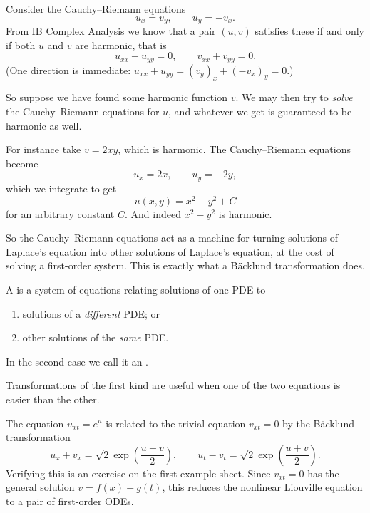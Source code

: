 \documentclass[a4paper]{scrartcl}
\begin{document}
\begin{example}
	Consider the Cauchy--Riemann equations
	$$
	u_x = v_y, \qquad u_y = -v_x.
	$$
	From IB Complex Analysis we know that a pair $(u,v)$ satisfies these if and only if both $u$ and $v$ are harmonic, that is
	$$
	u_{xx} + u_{yy} = 0, \qquad v_{xx}+v_{yy} = 0.
	$$
	(One direction is immediate: $u_{xx} + u_{yy} = (v_y)_x + (-v_x)_y = 0$.)

	So suppose we have found some harmonic function $v$. We may then try to \emph{solve} the Cauchy--Riemann equations for $u$, and whatever we get is guaranteed to be harmonic as well.

	For instance take $v = 2xy$, which is harmonic. The Cauchy--Riemann equations become
	$$
	u_x = 2x, \qquad u_y = -2y,
	$$
	which we integrate to get
	$$
	u(x,y) = x^2 - y^2 + C
	$$
	for an arbitrary constant $C$. And indeed $x^2 - y^2$ is harmonic.

	So the Cauchy--Riemann equations act as a machine for turning solutions of Laplace's equation into other solutions of Laplace's equation, at the cost of solving a first-order system. This is exactly what a B\"acklund transformation does.
\end{example}

\begin{definition}
	A  is a system of equations relating solutions of one PDE to
	\begin{enumerate}[label=(\roman*)]
		\item solutions of a \emph{different} PDE; or
		\item other solutions of the \emph{same} PDE.
	\end{enumerate}
	In the second case we call it an .
\end{definition}

Transformations of the first kind are useful when one of the two equations is easier than the other.

\begin{example}
	The equation $u_{xt} = e^u$ is related to the trivial equation $v_{xt} = 0$ by the B\"acklund transformation
	$$
	u_x + v_x = \sqrt2\exp\left(\frac{u-v}{2}\right), \qquad u_t - v_t = \sqrt2\exp\left(\frac{u+v}{2}\right).
	$$
	Verifying this is an exercise on the first example sheet. Since $v_{xt} = 0$ has the general solution $v = f(x) + g(t)$, this reduces the nonlinear Liouville equation to a pair of first-order ODEs.
\end{example}
\end{document}
